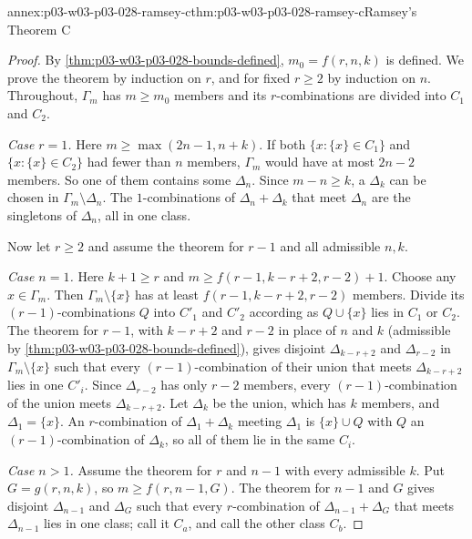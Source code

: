 \begin{annexitem}{annex:p03-w03-p03-028-ramsey-c}{thm:p03-w03-p03-028-ramsey-c}{Ramsey's Theorem C}
\begin{proof}
By \cref{thm:p03-w03-p03-028-bounds-defined}, \(m_0=f(r,n,k)\) is defined.
We prove the theorem by induction on \(r\), and for fixed \(r\geq2\) by
induction on \(n\).  Throughout, \(\Gamma_m\) has \(m\geq m_0\) members and
its \(r\)-combinations are divided into \(C_1\) and \(C_2\).

\emph{Case \(r=1\).}  Here \(m\geq\max(2n-1,n+k)\).  If both
\(\{x:\{x\}\in C_1\}\) and \(\{x:\{x\}\in C_2\}\) had fewer than \(n\)
members, \(\Gamma_m\) would have at most \(2n-2\) members.  So one of them
contains some \(\Delta_n\).  Since \(m-n\geq k\), a \(\Delta_k\) can be
chosen in \(\Gamma_m\setminus\Delta_n\).  The \(1\)-combinations of
\(\Delta_n+\Delta_k\) that meet \(\Delta_n\) are the singletons of
\(\Delta_n\), all in one class.

Now let \(r\geq2\) and assume the theorem for \(r-1\) and all admissible
\(n,k\).

\emph{Case \(n=1\).}  Here \(k+1\geq r\) and
\(m\geq f(r-1,k-r+2,r-2)+1\).  Choose any \(x\in\Gamma_m\).  Then
\(\Gamma_m\setminus\{x\}\) has at least \(f(r-1,k-r+2,r-2)\) members.
Divide its \((r-1)\)-combinations \(Q\) into \(C'_1\) and \(C'_2\)
according as \(Q\cup\{x\}\) lies in \(C_1\) or \(C_2\).  The theorem for
\(r-1\), with \(k-r+2\) and \(r-2\) in place of \(n\) and \(k\) (admissible
by \cref{thm:p03-w03-p03-028-bounds-defined}), gives disjoint
\(\Delta_{k-r+2}\) and \(\Delta_{r-2}\) in \(\Gamma_m\setminus\{x\}\) such
that every \((r-1)\)-combination of their union that meets
\(\Delta_{k-r+2}\) lies in one \(C'_i\).  Since \(\Delta_{r-2}\) has only
\(r-2\) members, every \((r-1)\)-combination of the union meets
\(\Delta_{k-r+2}\).  Let \(\Delta_k\) be the union, which has \(k\)
members, and \(\Delta_1=\{x\}\).  An \(r\)-combination of
\(\Delta_1+\Delta_k\) meeting \(\Delta_1\) is \(\{x\}\cup Q\) with \(Q\) an
\((r-1)\)-combination of \(\Delta_k\), so all of them lie in the same
\(C_i\).

\emph{Case \(n>1\).}  Assume the theorem for \(r\) and \(n-1\) with every
admissible \(k\).  Put \(G=g(r,n,k)\), so \(m\geq f(r,n-1,G)\).  The theorem
for \(n-1\) and \(G\) gives disjoint \(\Delta_{n-1}\) and \(\Delta_G\) such
that every \(r\)-combination of \(\Delta_{n-1}+\Delta_G\) that meets
\(\Delta_{n-1}\) lies in one class; call it \(C_a\), and call the other
class \(C_b\).


\end{proof}
\end{annexitem}
